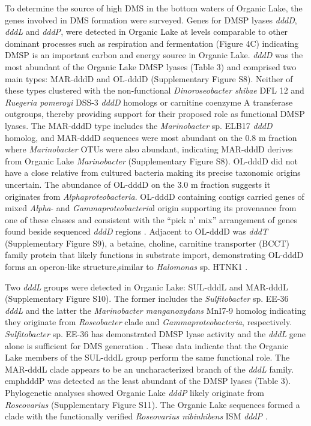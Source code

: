 To determine the source of high \ac{DMS} in the bottom waters of Organic Lake, the genes involved in \ac{DMS} formation were surveyed.
 Genes for \ac{DMSP} lyases \emph{dddD}, \emph{dddL} and \emph{dddP}, were detected in Organic Lake at levels comparable to other dominant processes such as respiration and fermentation (Figure 4C) indicating \ac{DMSP} is an important carbon and energy source in Organic Lake. 
\emph{dddD} was the most abundant of the Organic Lake \ac{DMSP} lyases (Table 3) and comprised two main types: MAR-dddD and OL-dddD (Supplementary Figure S8). 
Neither of these types clustered with the non-functional \emph{Dinoroseobacter shibae} DFL 12 and \emph{Ruegeria pomeroyi} DSS-3 \emph{dddD} homologs \cite{Todd2011} or carnitine coenzyme A transferase outgroups, thereby providing support for their proposed role as functional \ac{DMSP} lyases. 
The MAR-dddD type includes the \emph{Marinobacter} sp. ELB17 \emph{dddD} homolog, and MAR-dddD sequences were most abundant on the 0.8 \textmu{}m fraction where \emph{Marinobacter} \acp{OTU} were also abundant, indicating MAR-dddD derives from Organic Lake \emph{Marinobacter} (Supplementary Figure S8). 
OL-dddD did not have a close relative from cultured bacteria making its precise taxonomic origins uncertain. 
The abundance of OL-dddD on the 3.0 \textmu{}m fraction suggests it originates from \emph{Alphaproteobacteria}. 
OL-dddD containing contigs carried genes of mixed \emph{Alpha}- and \emph{Gammaproteobacteria}l origin supporting its provenance from one of these classes and consistent with the ``pick n' mix'' arrangement of genes found beside sequenced \emph{dddD} regions \cite{Johnston2008}. 
Adjacent to OL-dddD was \emph{dddT} (Supplementary Figure S9), a betaine, choline, carnitine transporter (BCCT) family protein that likely functions in substrate import, demonstrating OL-dddD forms an operon-like structure,similar to \emph{Halomonas} sp. HTNK1 \cite{Todd2010}.

Two \emph{dddL} groups were detected in Organic Lake: SUL-dddL and MAR-dddL (Supplementary Figure S10). 
The former includes the \emph{Sulfitobacter} sp. EE-36 \emph{dddL} and the latter the \emph{Marinobacter manganoxydans} MnI7-9 homolog indicating they originate from \emph{Roseobacter} clade and \emph{Gammaproteobacteria}, respectively. 
\emph{Sulfitobacter} sp. EE-36 has demonstrated \ac{DMSP} lyase activity and the \emph{dddL} gene alone is sufficient for \ac{DMS} generation \cite{Curson2008}. 
These data indicate that the Organic Lake members of the SUL-dddL group perform the same functional role. 
The MAR-dddL clade appears to be an uncharacterized branch of the \emph{dddL} family. 
emph{dddP} was detected as the least abundant of the \ac{DMSP} lyases (Table 3). 
Phylogenetic analyses showed Organic Lake \emph{dddP} likely originate from \emph{Roseovarius} (Supplementary Figure S11). 
The Organic Lake sequences formed a clade with the functionally verified \emph{Roseovarius nibinhibens} ISM \emph{dddP} \cite{Todd2009}. 

